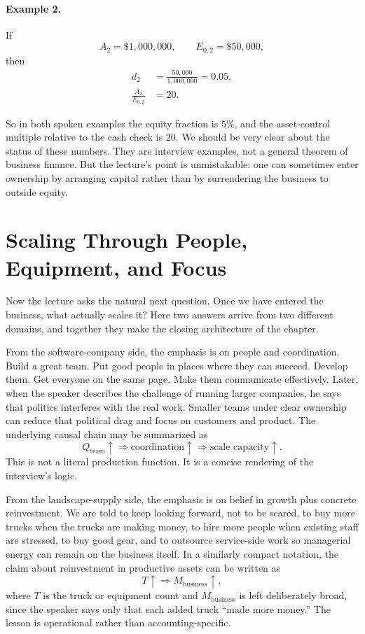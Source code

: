 \paragraph{Example 2.}
If
\[
A_2 = \$1{,}000{,}000,
\qquad
E_{0,2} = \$50{,}000,
\]
then
\begin{align}
d_2 &= \frac{50{,}000}{1{,}000{,}000} = 0.05, \\
\frac{A_2}{E_{0,2}} &= 20.
\end{align}

So in both spoken examples the equity fraction is \(5\%\), and the asset-control multiple relative to the cash check is \(20\). We should be very clear about the status of these numbers. They are interview examples, not a general theorem of business finance. But the lecture's point is unmistakable: one can sometimes enter ownership by arranging capital rather than by surrendering the business to outside equity.

\section{Scaling Through People, Equipment, and Focus}

Now the lecture asks the natural next question. Once we have entered the business, what actually scales it? Here two answers arrive from two different domains, and together they make the closing architecture of the chapter.

From the software-company side, the emphasis is on people and coordination. Build a great team. Put good people in places where they can succeed. Develop them. Get everyone on the same page. Make them communicate effectively. Later, when the speaker describes the challenge of running larger companies, he says that politics interferes with the real work. Smaller teams under clear ownership can reduce that political drag and focus on customers and product. The underlying causal chain may be summarized as
\begin{equation}
Q_{\text{team}} \uparrow
\Rightarrow
\text{coordination} \uparrow
\Rightarrow
\text{scale capacity} \uparrow.
\end{equation}
This is not a literal production function. It is a concise rendering of the interview's logic.

From the landscape-supply side, the emphasis is on belief in growth plus concrete reinvestment. We are told to keep looking forward, not to be scared, to buy more trucks when the trucks are making money, to hire more people when existing staff are stressed, to buy good gear, and to outsource service-side work so managerial energy can remain on the business itself. In a similarly compact notation, the claim about reinvestment in productive assets can be written as
\begin{equation}
T \uparrow \Rightarrow M_{\text{business}} \uparrow,
\end{equation}
where \(T\) is the truck or equipment count and \(M_{\text{business}}\) is left deliberately broad, since the speaker says only that each added truck ``made more money.'' The lesson is operational rather than accounting-specific.

